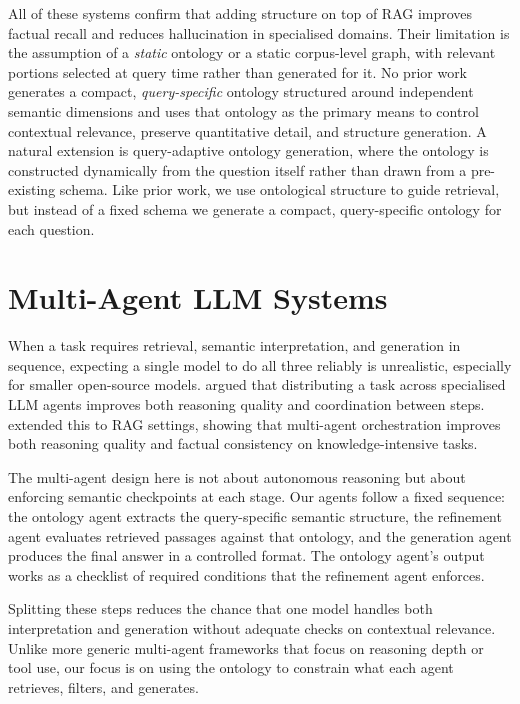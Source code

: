 All of these systems confirm that adding structure on top of RAG improves factual recall and reduces hallucination in specialised domains. Their limitation is the assumption of a \emph{static} ontology or a static corpus-level graph, with relevant portions selected at query time rather than generated for it. No prior work generates a compact, \emph{query-specific} ontology structured around independent semantic dimensions and uses that ontology as the primary means to control contextual relevance, preserve quantitative detail, and structure generation. A natural extension is query-adaptive ontology generation, where the ontology is constructed dynamically from the question itself rather than drawn from a pre-existing schema. Like prior work, we use ontological structure to guide retrieval, but instead of a fixed schema we generate a compact, query-specific ontology for each question.

\section{Multi-Agent LLM Systems}
\label{sec:rw-multi-agent}

When a task requires retrieval, semantic interpretation, and generation in sequence, expecting a single model to do all three reliably is unrealistic, especially for smaller open-source models. \citet{pan2023multiagent} argued that distributing a task across specialised LLM agents improves both reasoning quality and coordination between steps. \citet{zhao2025marag} extended this to RAG settings, showing that multi-agent orchestration improves both reasoning quality and factual consistency on knowledge-intensive tasks.

The multi-agent design here is not about autonomous reasoning but about enforcing semantic checkpoints at each stage. Our agents follow a fixed sequence: the ontology agent extracts the query-specific semantic structure, the refinement agent evaluates retrieved passages against that ontology, and the generation agent produces the final answer in a controlled format. The ontology agent's output works as a checklist of required conditions that the refinement agent enforces.

Splitting these steps reduces the chance that one model handles both interpretation and generation without adequate checks on contextual relevance. Unlike more generic multi-agent frameworks that focus on reasoning depth or tool use, our focus is on using the ontology to constrain what each agent retrieves, filters, and generates.

